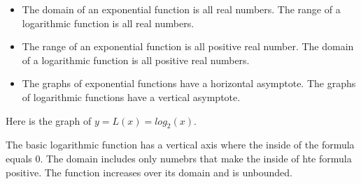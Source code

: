 \documentclass{ximera}
\begin{document}
\begin{itemize}

\item The domain of an exponential function is all real numbers. The range of a logarithmic function is all real numbers.  


\item The range of an exponential function is all positive real number. The domain of a logarithmic function is all positive real numbers.

\item The graphs of exponential functions have a horizontal asymptote. The graphs of logarithmic functions have a vertical asymptote. 

\end{itemize}






Here is the graph of $y = L(x) = log_2(x)$.

\begin{image}
\end{image}





The basic logarithmic function has a vertical axis where the inside of the formula equals $0$.  The domain includes only numebrs that make the inside of hte formula positive. The function increases over its domain and is unbounded.
\end{document}
